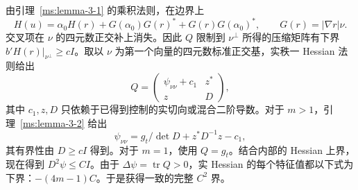 由引理~\ref{ms:lemma-3-1} 的乘积法则，在边界上
\[
 H(u)=\alpha_0H(r)+G(\alpha_0)G(r)^*+G(r)G(\alpha_0)^*,
 \qquad G(r)=|\nabla r|\nu .
\]
交叉项在 $\nu$ 的四元数正交补上消失。因此 $Q$ 限制到 $\nu^\perp$ 所得的压缩矩阵有下界 $b'H(r)|_{\nu^\perp}\ge cI$。取以 $\nu$ 为第一个向量的四元数标准正交基，实秩一 Hessian 法则给出
\[
 Q=\begin{pmatrix}\psi_{\nu\nu}+c_1&z^*\\z&D\end{pmatrix},
\]
其中 $c_1,z,D$ 只依赖于已得到控制的实切向或混合二阶导数。对于 $m>1$，引理~\ref{ms:lemma-3-2} 给出
\[
 \psi_{\nu\nu}=g_t/\det D+z^*D^{-1}z-c_1,
\]
其有界性由 $D\ge cI$ 得到。对于 $m=1$，使用 $Q=g_t$。结合内部的 Hessian 上界，现在得到 $D^2\psi\le CI$。由于 $\Delta\psi=\operatorname{tr}Q>0$，实 Hessian 的每个特征值都以下式为下界：$-(4m-1)C$。于是获得一致的完整 $C^2$ 界。
